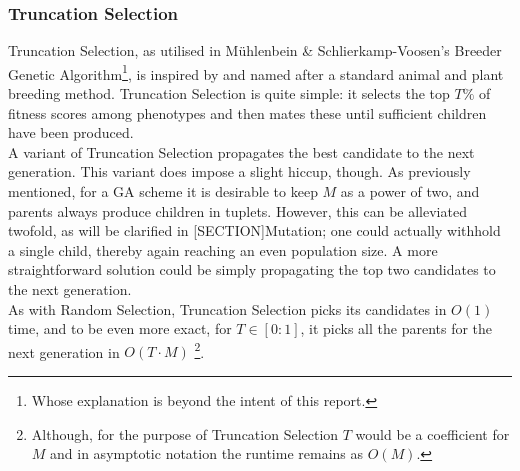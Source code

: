 \subsubsection{Truncation Selection}
Truncation Selection\cite{Wiki-truncation-selection}, as utilised in Mühlenbein \& Schlierkamp-Voosen's\cite{Truncation-Selection-Breeder-Algorithm} Breeder Genetic Algorithm\footnote{Whose explanation is beyond the intent of this report.}, is inspired by and named after a standard animal and plant breeding method. Truncation Selection is quite simple: it selects the top $T\%$ of fitness scores among phenotypes and then mates these until sufficient children have been produced.
\\
A variant of Truncation Selection propagates the best candidate to the next generation. This variant does impose a slight hiccup, though. As previously mentioned, for a GA scheme it is desirable to keep $M$ as a power of two, and parents always produce children in tuplets. However, this can be alleviated twofold, as will be clarified in [SECTION]Mutation; one could actually withhold a single child, thereby again reaching an even population size. A more straightforward solution could be simply propagating the top two candidates to the next generation.
\\
As with Random Selection, Truncation Selection picks its candidates in $O(1)$ time, and to be even more exact, for $T \in [0:1]$, it picks all the parents for the next generation in $O(T \cdot M)$ \footnote{Although, for the purpose of Truncation Selection $T$ would be a coefficient for $M$ and in asymptotic notation the runtime remains as $O(M)$.}.


